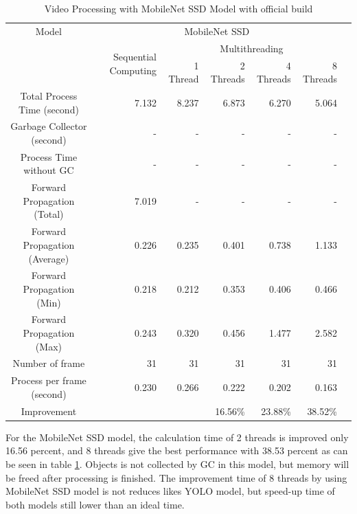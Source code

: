             \begin{table}[!htp]\centering
                \scriptsize
                \begin{tabular}{lrrrrrrr}\toprule
                    \multicolumn{2}{c}{Model} &\multicolumn{5}{c}{MobileNet SSD} \\\cmidrule{1-7}
                    \multicolumn{2}{c}{\multirow{2}{*}{}} &\multirow{2}{*}{Sequential Computing} &\multicolumn{4}{c}{Multithreading} \\\cmidrule{4-7}
                    & & &1 Thread &2 Threads &4 Threads &8 Threads \\\midrule
                    \multicolumn{2}{c}{Total Process Time (second)} &7.132 &8.237 &6.873 &6.270 &5.064 \\
                    \multicolumn{2}{c}{Garbage Collector (second)} &- &- &- &- &- \\
                    \multicolumn{2}{c}{Process Time without GC} &- &- &- &- &- \\
                    \multicolumn{2}{c}{Forward Propagation (Total)} &7.019 &- &- &- &- \\
                    \multicolumn{2}{c}{Forward Propagation (Average)} &0.226 &0.235 &0.401 &0.738 &1.133 \\
                    \multicolumn{2}{c}{Forward Propagation (Min)} &0.218 &0.212 &0.353 &0.406 &0.466 \\
                    \multicolumn{2}{c}{Forward Propagation (Max)} &0.243 &0.320 &0.456 &1.477 &2.582 \\
                    \multicolumn{2}{c}{Number of frame} &31 &31 &31 &31 &31 \\
                    \multicolumn{2}{c}{Process per frame (second)} &0.230 &0.266 &0.222 &0.202 &0.163 \\
                    \multicolumn{2}{c}{Improvement} & & &16.56\% &23.88\% &38.52\% \\
                    \bottomrule
                \end{tabular}

                \caption{Video Processing with MobileNet SSD Model with official build}\label{ssd:official-performace}
            \end{table}

            For the MobileNet SSD model,
            the calculation time of 2 threads is improved only 16.56 percent,
            and 8 threads give the best performance with 38.53 percent as can be seen in table \ref{ssd:official-performace}.
            Objects is not collected by GC in this model, but memory will be freed after processing is finished.
            The improvement time of 8 threads by using MobileNet SSD model is not reduces likes YOLO model,
            but speed-up time of both models still lower than an ideal time.

